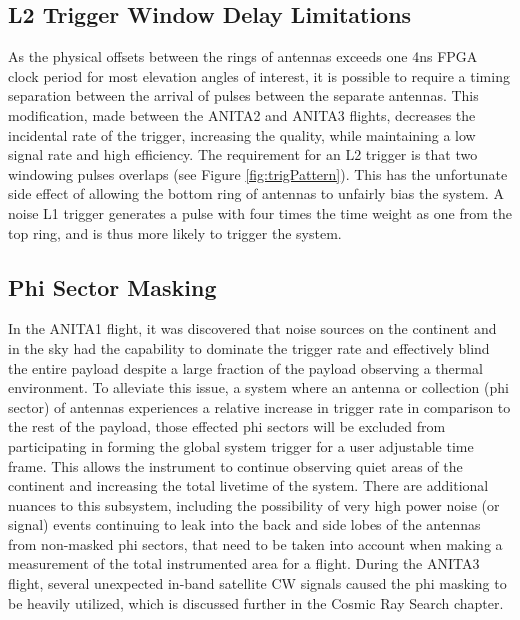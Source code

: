 				
	\subsection{L2 Trigger Window Delay Limitations}
		As the physical offsets between the rings of antennas exceeds one 4ns FPGA clock period for most elevation angles of interest, it is possible to require a timing separation between the arrival of pulses between the separate antennas.  This modification, made between the ANITA2 and ANITA3 flights, decreases the incidental rate of the trigger, increasing the quality, while maintaining a low signal rate and high efficiency.  The requirement for an L2 trigger is that two windowing pulses overlaps (see Figure \ref{fig:trigPattern}).  This has the unfortunate side effect of allowing the bottom ring of antennas to unfairly bias the system. A noise L1 trigger generates a pulse with four times the time weight as one from the top ring, and is thus more likely to trigger the system.  
		
	\subsection{Phi Sector Masking}
		In the ANITA1 flight, it was discovered that noise sources on the continent and in the sky had the capability to dominate the trigger rate and effectively blind the entire payload despite a large fraction of the payload observing a thermal environment. To alleviate this issue, a system where an antenna or collection (phi sector) of antennas experiences a relative increase in trigger rate in comparison to the rest of the payload, those effected phi sectors will be excluded from participating in forming the global system trigger for a user adjustable time frame.  This allows the instrument to continue observing quiet areas of the continent and increasing the total livetime of the system.  There are additional nuances to this subsystem, including the possibility of very high power noise (or signal) events continuing to leak into the back and side lobes of the antennas from non-masked phi sectors, that need to be taken into account when making a measurement of the total instrumented area for a flight.  During the ANITA3 flight, several unexpected in-band satellite CW signals caused the phi masking to be heavily utilized, which is discussed further in the Cosmic Ray Search chapter.
		
		
